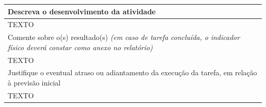\documentclass[a4paper,12pt]{article}
\begin{document}
\begin{table}[h]
\begin{longtable}{|p{}|} %
    \hline
    \rowcolor{lightgray} 
    \fontsize{8}{10}\selectfont Descreva o desenvolvimento da atividade \\ \hline 
    \endhead
    
    \fontsize{10}{12}\selectfont 
    TEXTO \\ \hline
    
    \rowcolor{lightgray} 
    \fontsize{8}{10}\selectfont Comente sobre o(s) resultado(s) \textit{(em caso de tarefa concluída, o indicador físico deverá constar como anexo no relatório)} \\
    \hline
    {\fontsize{10}{12}\selectfont TEXTO} \\ \hline
    
    \rowcolor{lightgray} 
    \fontsize{8}{10}\selectfont Justifique o eventual atraso ou adiantamento da execução da tarefa, em relação à previsão inicial \\
    \hline
    {\fontsize{10}{12}\selectfont TEXTO} \\ \hline
\end{longtable}
\end{table}

\newpage


\end{document}

